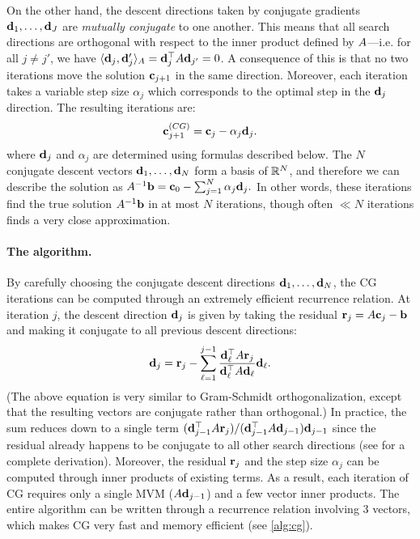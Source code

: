 On the other hand, the descent directions taken by conjugate gradients $\mathbf{d}_1, \ldots, \mathbf{d}_J$ are \emph{mutually conjugate} to one another.
This means that all search directions are orthogonal with respect to the inner product defined by $A$---i.e. for all $j \ne j'$, we have $\langle \mathbf{d}_j, \mathbf{d}_j' \rangle_{A} = \mathbf{d}_j^\top A \mathbf{d}_{j'} = 0$.
A consequence of this is that no two iterations move the solution $\mathbf{c}_{j+1}$ in the same direction.
Moreover, each iteration takes a variable step size $\alpha_j$ which corresponds to the optimal step in the $\mathbf{d}_j$ direction.
The resulting iterations are:
%
\begin{equation*}
  \mathbf{c}_{j+1}^{\text(CG)} = \mathbf{c}_{j} - \alpha_j \mathbf{d}_{j}.
\end{equation*}
%
where $\mathbf{d}_j$ and $\alpha_j$ are determined using formulas described below.
The $N$ conjugate descent vectors $\mathbf{d}_1, \ldots, \mathbf{d}_N$ form a basis of $\mathbb{R}^N$, and therefore we can describe the solution as $A^{-1} \mathbf{b} = \mathbf{c}_0 - \sum_{j=1}^N \alpha_j \mathbf{d}_j.$
In other words, these iterations find the true solution $A^{-1} \mathbf{b}$ in at most $N$ iterations, though often $\ll N$ iterations finds a very close approximation.

\paragraph{The algorithm.}
By carefully choosing the conjugate descent directions $\mathbf{d}_1, \ldots, \mathbf{d}_N$, the CG iterations can be computed through an extremely efficient recurrence relation.
At iteration $j$, the descent direction $\mathbf{d}_j$ is given by taking the residual $\mathbf{r}_j = A \mathbf{c}_{j} - \mathbf{b}$ and making it conjugate to all previous descent directions:
%
\begin{equation*}
  \mathbf{d}_j = \mathbf{r}_j - \sum_{\ell = 1}^{j-1} \frac{ \mathbf{d}_\ell^\top A \mathbf{r}_j }{ \mathbf{d}_\ell^\top A \mathbf{d}_\ell } \mathbf{d}_\ell.
\end{equation*}
%
(The above equation is very similar to Gram-Schmidt orthogonalization, except that the resulting vectors are conjugate rather than orthogonal.)
In practice, the sum reduces down to a single term $( \mathbf{d}_{j-1}^\top A \mathbf{r}_j ) / ( \mathbf{d}_{j-1}^\top A \mathbf{d}_{j-1} ) \mathbf{d}_{j-1}$ since the residual already happens to be conjugate to all other search directions (see \citep[Sec. 7-8]{shewchuk1994introduction} for a complete derivation).
Moreover, the residual $\mathbf{r}_j$ and the step size $\alpha_j$ can be computed through inner products of existing terms.
As a result, each iteration of CG requires only a single MVM ($A \mathbf{d}_{j-1}$) and a few vector inner products.
The entire algorithm can be written through a recurrence relation involving 3 vectors, which makes CG very fast and memory efficient (see \cref{alg:cg}).

